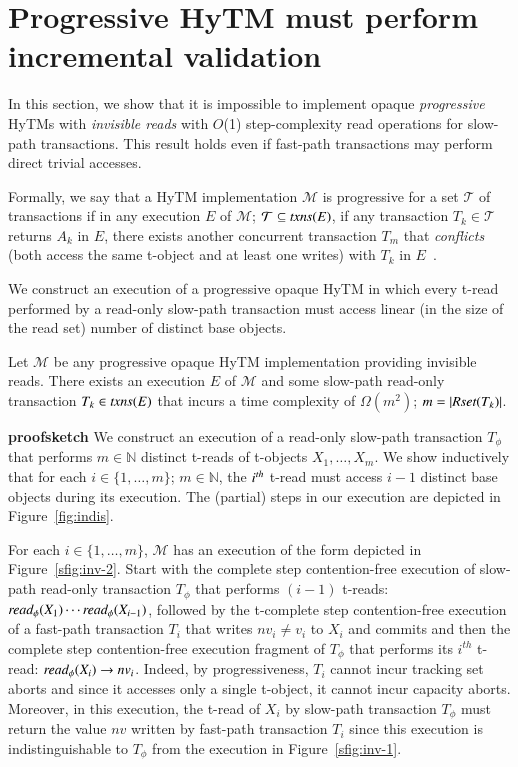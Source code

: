 \section{Progressive HyTM must perform incremental validation}
\label{sec:lb}
%
In this section, we show that it is impossible to implement opaque \emph{progressive} HyTMs with \emph{invisible reads}
with $O$(1) step-complexity read operations for slow-path transactions. 
This result holds even if fast-path transactions may perform
direct trivial accesses.

Formally, we say that a HyTM implementation $\mathcal{M}$ is progressive
for a set $\mathcal{T}$ of transactions
if in any execution $E$ of $\mathcal{M}$; $\mathcal{T} \subseteq \ms{txns}(E)$, 
if any transaction $T_k \in \mathcal{T}$ returns $A_k$ in $E$, there exists 
another concurrent transaction $T_m$ that \emph{conflicts} (both access the same t-object and at least one writes) with $T_k$ in $E$~\cite{tm-book}.

We construct an execution of a progressive opaque HyTM in which every t-read performed by a read-only slow-path transaction
must access linear (in the size of the read set) number of distinct base objects.
%
\begin{theorem}
\label{th:impossibility}
Let $\mathcal{M}$ be any progressive opaque HyTM implementation providing invisible reads.
There exists an execution $E$ of $\mathcal{M}$ and some slow-path read-only transaction $T_k \in \ms{txns}(E)$
that incurs a time complexity of $\Omega (m^2)$; $m=|\textit{Rset}(T_k)|$.
\end{theorem}
%
\noindent\textbf{proofsketch}
	We construct an execution of a read-only slow-path transaction $T_{\phi}$ that performs $m \in \mathbb{N}$
	distinct t-reads of t-objects $X_1,\ldots , X_m$. We show inductively that for each 
	$i\in \{1,\ldots , m\}$; $m \in \mathbb{N}$, the $i^{\ms{th}}$ t-read must access $i-1$ distinct base objects
	during its execution. The (partial) steps in our execution are depicted in Figure~\ref{fig:indis}.
	
	For each $i\in \{1,\ldots , m\}$, $\mathcal{M}$ has an execution of the form depicted in Figure~\ref{sfig:inv-2}.
	Start with the complete step contention-free execution of slow-path read-only transaction $T_{\phi}$ that performs
	$(i-1)$ t-reads: $\textit{read}_{\phi}(X_1)\cdots \textit{read}_{\phi}(X_{i-1})$, followed by the t-complete step contention-free execution of a fast-path transaction $T_{i}$
	that writes $nv_i\neq v_i$ to $X_i$ and commits and then the complete step contention-free execution fragment of $T_{\phi}$ that performs its $i^{th}$ t-read:
	$\textit{read}_{\phi}(X_i) \rightarrow nv_i$. Indeed, by progressiveness, $T_i$ cannot incur tracking set aborts and since it accesses only a single t-object, it cannot incur capacity aborts.
	Moreover, in this execution, the t-read of $X_i$ by slow-path transaction $T_{\phi}$ must return the value $nv$ written by fast-path transaction $T_i$ since this execution is indistinguishable
	to $T_{\phi}$ from the execution in Figure~\ref{sfig:inv-1}. 
	
